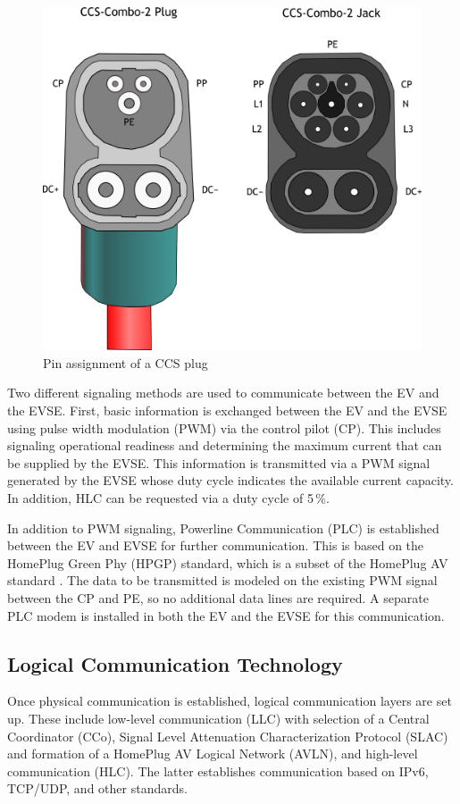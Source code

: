 \documentclass[sigconf]{acmart}
\begin{document}
\begin{figure}[ht]
    \centering
    \includegraphics[width=0.7\linewidth]{graphics/CCS-Combo-2.png}
    \caption{Pin assignment of a CCS plug \citep{Ajzh2074-CCS-Plug}}
    \label{fig:CCS-pinout}
\end{figure}

Two different signaling methods are used to communicate between the EV and the EVSE. First, basic information is exchanged between the EV and the EVSE using pulse width modulation (PWM) via the control pilot (CP). This includes signaling operational readiness and determining the maximum current that can be supplied by the EVSE. This information is transmitted via a PWM signal generated by the EVSE whose duty cycle indicates the available current capacity. In addition, HLC can be requested via a duty cycle of 5\,\%. \citep[pp.\,36--43]{bahrami-ev-2020}

In addition to PWM signaling, Powerline Communication (PLC) is established between the EV and EVSE for further communication. This is based on the HomePlug Green Phy (HPGP) standard, which is a subset of the HomePlug AV standard \citep[p.\,11]{homeplug-green-phy-whitepaper}. The data to be transmitted is modeled on the existing PWM signal between the CP and PE, so no additional data lines are required. A separate PLC modem is installed in both the EV and the EVSE for this communication.

\subsection{Logical Communication Technology}
Once physical communication is established, logical communication layers are set up. These include low-level communication (LLC) with selection of a Central Coordinator (CCo), Signal Level Attenuation Characterization Protocol (SLAC) and formation of a HomePlug AV Logical Network (AVLN), and high-level communication (HLC). The latter establishes communication based on IPv6, TCP/UDP, and other standards. \citep[p.\,49]{bahrami-ev-2020}
\end{document}
